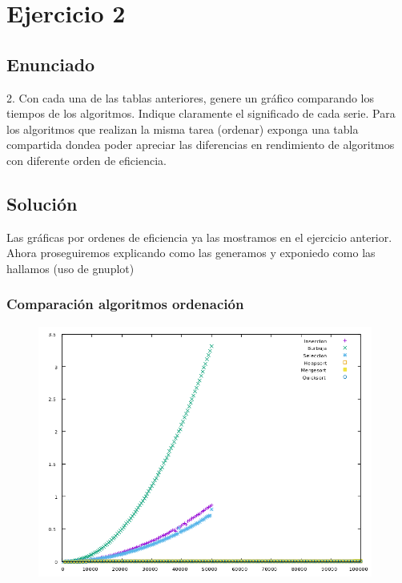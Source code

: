 \documentclass[compress]{beamer}
\begin{document}
\section{Ejercicio 2}
\subsection{Enunciado}

\begin{frame}
	2. Con cada una de las tablas anteriores, genere un gráfico comparando los tiempos  de
los algoritmos. Indique claramente el significado de cada serie. Para los algoritmos que
realizan la misma tarea (ordenar) exponga una tabla compartida dondea poder apreciar las diferencias en rendimiento de algoritmos con diferente orden de
eficiencia.
\end{frame}
\subsection{Solución}
\begin{frame}
Las gráficas por ordenes de eficiencia ya las mostramos en el ejercicio anterior. Ahora proseguiremos explicando como las generamos y exponiedo como las hallamos (uso de gnuplot)
\end{frame}
\begin{frame}
\frametitle{Comparación algoritmos ordenación}
	\begin{figure}
  \centering
    \includegraphics[width=0.98\textwidth]{Ordenacion.png}
  \label{fig:ejemplo}
\end{figure}
\end{frame}
\end{document}
